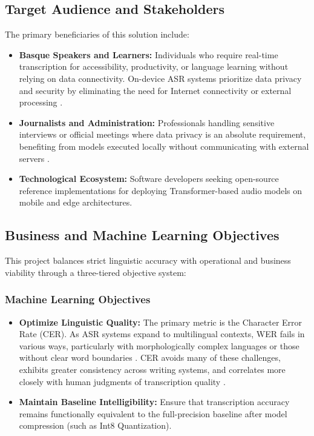 \documentclass[12pt]{article}
\begin{document}
\subsection{Target Audience and Stakeholders}
The primary beneficiaries of this solution include:
\begin{itemize}
    \item \textbf{Basque Speakers and Learners:} Individuals who require real-time transcription for accessibility, productivity, or language learning without relying on data connectivity. On-device ASR systems prioritize data privacy and security by eliminating the need for Internet connectivity or external processing \cite{ieee2025}.
    \item \textbf{Journalists and Administration:} Professionals handling sensitive interviews or official meetings where data privacy is an absolute requirement, benefiting from models executed locally without communicating with external servers \cite{mdpi2024}.
    \item \textbf{Technological Ecosystem:} Software developers seeking open-source reference implementations for deploying Transformer-based audio models on mobile and edge architectures.
\end{itemize}

\subsection{Business and Machine Learning Objectives}
This project balances strict linguistic accuracy with operational and business viability through a three-tiered objective system:

\subsubsection{Machine Learning Objectives}
\begin{itemize}
    \item \textbf{Optimize Linguistic Quality:} The primary metric is the Character Error Rate (CER). As ASR systems expand to multilingual contexts, WER fails in various ways, particularly with morphologically complex languages or those without clear word boundaries \cite{cer2025}. CER avoids many of these challenges, exhibits greater consistency across writing systems, and correlates more closely with human judgments of transcription quality \cite{cer2025}.
    \item \textbf{Maintain Baseline Intelligibility:} Ensure that transcription accuracy remains functionally equivalent to the full-precision baseline after model compression (such as Int8 Quantization).
\end{itemize}
\end{document}

